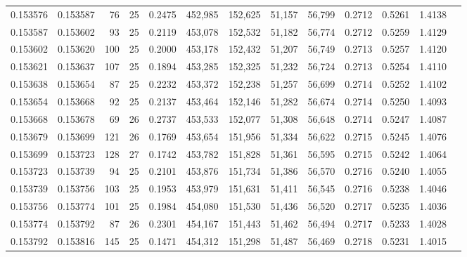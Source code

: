 \begin{tabular}{rrrrrrrrrrrrr}
0.153576 & 0.153587 &    76 &  25 &                                     0.2475 & 452,985 & 152,625 &  51,157 &  56,799 & 0.2712 & 0.5261 & 1.4138 \\
0.153587 & 0.153602 &    93 &  25 &                                     0.2119 & 453,078 & 152,532 &  51,182 &  56,774 & 0.2712 & 0.5259 & 1.4129 \\
0.153602 & 0.153620 &   100 &  25 &                                     0.2000 & 453,178 & 152,432 &  51,207 &  56,749 & 0.2713 & 0.5257 & 1.4120 \\
0.153621 & 0.153637 &   107 &  25 &                                     0.1894 & 453,285 & 152,325 &  51,232 &  56,724 & 0.2713 & 0.5254 & 1.4110 \\
0.153638 & 0.153654 &    87 &  25 &                                     0.2232 & 453,372 & 152,238 &  51,257 &  56,699 & 0.2714 & 0.5252 & 1.4102 \\
0.153654 & 0.153668 &    92 &  25 &                                     0.2137 & 453,464 & 152,146 &  51,282 &  56,674 & 0.2714 & 0.5250 & 1.4093 \\
0.153668 & 0.153678 &    69 &  26 &                                     0.2737 & 453,533 & 152,077 &  51,308 &  56,648 & 0.2714 & 0.5247 & 1.4087 \\
0.153679 & 0.153699 &   121 &  26 &                                     0.1769 & 453,654 & 151,956 &  51,334 &  56,622 & 0.2715 & 0.5245 & 1.4076 \\
0.153699 & 0.153723 &   128 &  27 &                                     0.1742 & 453,782 & 151,828 &  51,361 &  56,595 & 0.2715 & 0.5242 & 1.4064 \\
0.153723 & 0.153739 &    94 &  25 &                                     0.2101 & 453,876 & 151,734 &  51,386 &  56,570 & 0.2716 & 0.5240 & 1.4055 \\
0.153739 & 0.153756 &   103 &  25 &                                     0.1953 & 453,979 & 151,631 &  51,411 &  56,545 & 0.2716 & 0.5238 & 1.4046 \\
0.153756 & 0.153774 &   101 &  25 &                                     0.1984 & 454,080 & 151,530 &  51,436 &  56,520 & 0.2717 & 0.5235 & 1.4036 \\
0.153774 & 0.153792 &    87 &  26 &                                     0.2301 & 454,167 & 151,443 &  51,462 &  56,494 & 0.2717 & 0.5233 & 1.4028 \\
0.153792 & 0.153816 &   145 &  25 &                                     0.1471 & 454,312 & 151,298 &  51,487 &  56,469 & 0.2718 & 0.5231 & 1.4015 \\

\end{tabular}
